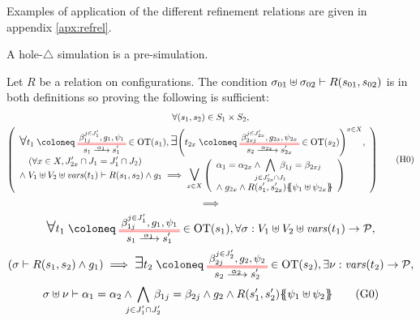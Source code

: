\documentclass{article}
\begin{document}
Examples of application of the different refinement relations are given in appendix \ref{apx:refrel}.
\begin{thm} A hole-\(\triangle\) simulation is a pre-simulation. \end{thm}
Let \(R\) be a relation on configurations.
The condition \(\sigma_{01} \uplus \sigma_{02} \vdash R{\left(s_{01}, s_{02}\right)}\) is in both definitions so proving the following is sufficient:
\begin{multline}
	\forall \mpar{s_1, s_2} \in S_1 \times S_2, \\
	\mpar{\everymath{\displaystyle}\begin{array}{l}
		\bigsymb{\forall} t_1 \defobject \OTx{1}{}{1}{1} \in \fOT{s_1}, \bigsymb{\exists} \mpar{t_{2x} \defobject \OTx{2}{x}{2x}{2x} \in \fOT{s_2}}^{x \in X}, \\
		\quad \mpar{\forall x \in X, J'_{2x} \cap J_1 = J'_1 \cap J_2} \\[-10pt]
		\nwedge V_1 \uplus V_2 \uplus \fvars{t_1} \vdash R\mpar{s_1, s_2} \wedge g_1 \implies \operatorname*{\bigsymb{\bigvee}}_{x \in X} \mpar{\begin{array}{l}
			\alpha_1 = \alpha_{2x} \wedge \bigwedge_\subbox{j \in J'_{2x} \cap J_1} \beta_{1j} = \beta_{2xj} \\[12pt]
			\nwedge g_{2x} \wedge R\mpar{s'_1, s'_{2x}}\psubst{\psi_1 \uplus \psi_{2x}}
		\end{array}}
	\end{array}} \hyp{0}
\end{multline}
\[ \implies \]
\begin{multline}
	\bigsymb{\forall} t_1 \defobject \OTx{1}{}{1}{1} \in \fOT{s_1}, \forall \sigma: V_1 \uplus V_2 \uplus \fvars{t_1} \to \values, \\
	\mpar{\sigma \vdash R\mpar{s_1, s_2} \wedge g_1} \implies \bigsymb{\exists} t_2 \defobject \OTx{2}{}{2}{2} \in \fOT{s_2}, \exists \nu: \fvars{t_2} \to \values, \\
	\sigma \uplus \nu \vdash \alpha_1 = \alpha_2 \wedge \bigwedge_\subbox{j \in J'_1 \cap J'_2} \beta_{1j} = \beta_{2j} \wedge g_2 \wedge R\mpar{s'_1, s'_2}\psubst{\psi_1 \uplus \psi_2} \goal{0}
\end{multline}
\end{document}
